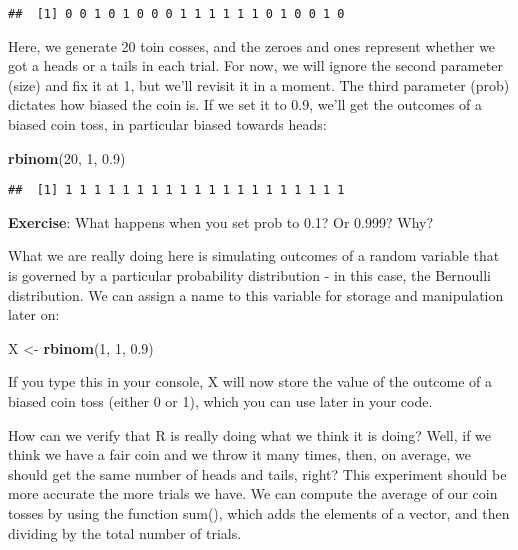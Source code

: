 \documentclass[
]{book}
\newenvironment{Shaded}{\begin{snugshade}}{\end{snugshade}}
\newcommand{\DecValTok}[1]{\textcolor[rgb]{0.00,0.00,0.81}{#1}}
\newcommand{\FloatTok}[1]{\textcolor[rgb]{0.00,0.00,0.81}{#1}}
\newcommand{\KeywordTok}[1]{\textcolor[rgb]{0.13,0.29,0.53}{\textbf{#1}}}
\newcommand{\NormalTok}[1]{#1}
\newcommand{\StringTok}[1]{\textcolor[rgb]{0.31,0.60,0.02}{#1}}
\begin{document}
\begin{verbatim}
##  [1] 0 0 1 0 1 0 0 0 1 1 1 1 1 1 0 1 0 0 1 0
\end{verbatim}

Here, we generate 20 toin cosses, and the zeroes and ones represent whether we got a heads or a tails in each trial. For now, we will ignore the second parameter (size) and fix it at 1, but we'll revisit it in a moment. The third parameter (prob) dictates how biased the coin is. If we set it to 0.9, we'll get the outcomes of a biased coin toss, in particular biased towards heads:

\begin{Shaded}
\begin{Highlighting}[]
\KeywordTok{rbinom}\NormalTok{(}\DecValTok{20}\NormalTok{, }\DecValTok{1}\NormalTok{, }\FloatTok{0.9}\NormalTok{)}
\end{Highlighting}
\end{Shaded}

\begin{verbatim}
##  [1] 1 1 1 1 1 1 1 1 1 1 1 1 1 1 1 1 1 1 1 1
\end{verbatim}

\textbf{Exercise}: What happens when you set prob to 0.1? Or 0.999? Why?

What we are really doing here is simulating outcomes of a random variable that is governed by a particular probability distribution - in this case, the Bernoulli distribution. We can assign a name to this variable for storage and manipulation later on:

\begin{Shaded}
\begin{Highlighting}[]
\NormalTok{X \textless{}{-}}\StringTok{ }\KeywordTok{rbinom}\NormalTok{(}\DecValTok{1}\NormalTok{, }\DecValTok{1}\NormalTok{, }\FloatTok{0.9}\NormalTok{)}
\end{Highlighting}
\end{Shaded}

If you type this in your console, X will now store the value of the outcome of a biased coin toss (either 0 or 1), which you can use later in your code.

How can we verify that R is really doing what we think it is doing? Well, if we think we have a fair coin and we throw it many times, then, on average, we should get the same number of heads and tails, right? This experiment should be more accurate the more trials we have. We can compute the average of our coin tosses by using the function sum(), which adds the elements of a vector, and then dividing by the total number of trials.
\end{document}

